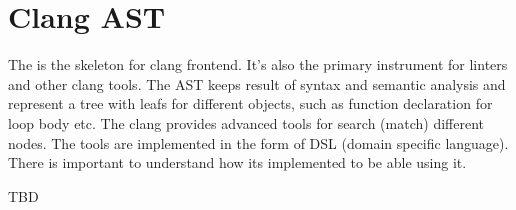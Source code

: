 \section{Clang AST}
The  is the skeleton for clang frontend. It's also the primary
instrument for linters and other clang tools. The AST keeps result of syntax and
semantic analysis and represent a tree with leafs for different objects, such as
function declaration for loop body etc. The clang provides advanced tools for
search (match) different nodes. The tools are implemented in the form of DSL
(domain specific language). There is important to understand how its
implemented to be able using it.

TBD
